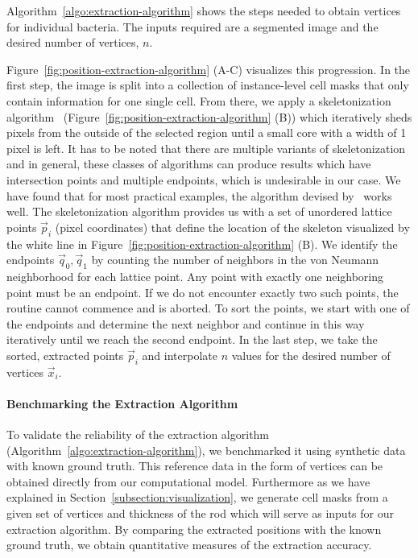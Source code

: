 Algorithm~\ref{algo:extraction-algorithm} shows the steps needed to obtain vertices for individual
bacteria.
The inputs required are a segmented image and the desired number of vertices, $n$.

Figure~\ref{fig:position-extraction-algorithm} (A-C) visualizes this progression.
In the first step, the image is split into a collection of instance-level cell masks that only
contain information for one single cell.
From there, we apply a skeletonization algorithm~\cite{Lee1994}
(Figure~\ref{fig:position-extraction-algorithm} (B)) which iteratively sheds pixels from the outside
of the selected region until a small core with a width of 1 pixel is left.
It has to be noted that there are multiple variants of skeletonization and in general, these classes
of algorithms can produce results which have intersection points and multiple endpoints, which is
undesirable in our case.
We have found that for most practical examples, the algorithm devised by~\cite{Lee1994} works well.
The skeletonization algorithm provides us with a set of unordered lattice points $\vec{p}_i$
(pixel coordinates) that define the location of the skeleton visualized by the white line in
Figure~\ref{fig:position-extraction-algorithm} (B).
We identify the endpoints $\vec{q}_0,\vec{q}_1$ by counting the number of neighbors in the von
Neumann neighborhood for each lattice point.
Any point with exactly one neighboring point must be an endpoint.
If we do not encounter exactly two such points, the routine cannot commence and is aborted.
To sort the points, we start with one of the endpoints and determine the next neighbor and
continue in this way iteratively until we reach the second endpoint.
In the last step, we take the sorted, extracted points $\vec{p}_i$ and interpolate $n$ values for
the desired number of vertices $\vec{x}_i$.

\paragraph{Benchmarking the Extraction Algorithm}

To validate the reliability of the extraction algorithm
(Algorithm~\ref{algo:extraction-algorithm}), we benchmarked it using synthetic data with known
ground truth. This reference data in the form of vertices can be obtained directly from our
computational model.
Furthermore as we have explained in Section~\ref{subsection:visualization}, we generate cell masks
from a given set of vertices and thickness of the rod which will serve as inputs for our extraction
algorithm. By comparing the extracted positions with the known ground truth, we obtain
quantitative measures of the extraction accuracy.

